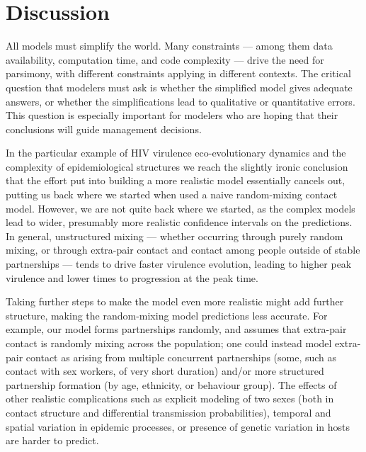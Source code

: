\documentclass[10pt,letterpaper]{article}
\newcommand{\etal}{\textit{et al.}}
\begin{document}
\section*{Discussion}

All models must simplify the world.  Many constraints --- among them data
availability, computation time, and code complexity --- drive the need
for parsimony, with different constraints applying in different
contexts. The critical question that modelers must ask is whether the
simplified model gives adequate answers, or whether the
simplifications lead to qualitative or quantitative errors.
This question is especially important for modelers who
are hoping that their conclusions will guide management decisions.

In the particular example of HIV virulence eco-evolutionary dynamics
and the complexity of epidemiological structures
we reach the slightly ironic conclusion that the
effort put into building a more realistic model essentially cancels
out, putting us back where we started when used a naive random-mixing
contact model.
However, we are not quite back where we started, as the
complex models lead to wider, presumably more realistic
confidence intervals on the predictions.
In general, unstructured mixing --- whether occurring through 
purely random mixing, or through extra-pair contact and contact
among people outside of stable partnerships --- tends to drive
faster virulence evolution, leading to higher peak virulence and 
lower times to progression at the peak time.

Taking further steps to make the model even more realistic
might add further structure,
making the random-mixing model predictions less accurate. For
example, our model forms partnerships randomly, and assumes that
extra-pair contact is randomly mixing across the population;
one could instead model extra-pair contact as arising from
multiple concurrent partnerships (some, such as contact with sex
workers, of very short duration) and/or more structured partnership
formation (by age, ethnicity, or behaviour group). The effects of
other realistic complications such as explicit modeling of two
sexes (both in contact structure and differential transmission
probabilities), temporal and spatial variation in epidemic processes,
or presence of genetic variation in hosts are harder to predict.
\end{document}

